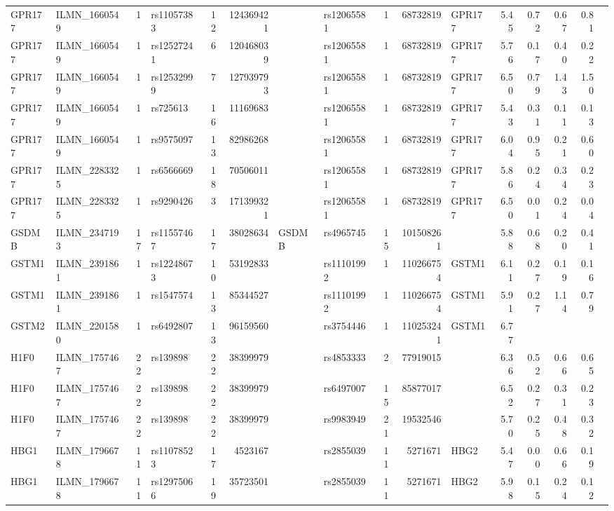 \documentclass{article}
\begin{document}
\begin{landscape}
{\begin{ThreePartTable}
\begin{longtable}{|llr|lrrl|lrrl|rrrr|r|}
  GPR177 & ILMN\_1660549 & 1 & rs11057383 & 12 & 124369421 &  & rs12065581 & 1 & 68732819 & GPR177 & 5.45 & 0.72 & 0.67 & 0.81 &  \\
  GPR177 & ILMN\_1660549 & 1 & rs12527241 & 6 & 120468039 &  & rs12065581 & 1 & 68732819 & GPR177 & 5.76 & 0.17 & 0.40 & 0.22 &  \\
  GPR177 & ILMN\_1660549 & 1 & rs12532999 & 7 & 127939793 &  & rs12065581 & 1 & 68732819 & GPR177 & 6.50 & 0.79 & 1.43 & 1.50 &  \\
  GPR177 & ILMN\_1660549 & 1 & rs725613 & 16 & 11169683 &  & rs12065581 & 1 & 68732819 & GPR177 & 5.43 & 0.31 & 0.11 & 0.13 &  \\
  GPR177 & ILMN\_1660549 & 1 & rs9575097 & 13 & 82986268 &  & rs12065581 & 1 & 68732819 & GPR177 & 6.04 & 0.95 & 0.21 & 0.60 &  \\
  GPR177 & ILMN\_2283325 & 1 & rs6566669 & 18 & 70506011 &  & rs12065581 & 1 & 68732819 & GPR177 & 5.86 & 0.24 & 0.34 & 0.23 &  \\
  GPR177 & ILMN\_2283325 & 1 & rs9290426 & 3 & 171399321 &  & rs12065581 & 1 & 68732819 & GPR177 & 6.50 & 0.01 & 0.24 & 0.04 &  \\
  GSDMB & ILMN\_2347193 & 17 & rs11557467 & 17 & 38028634 & GSDMB & rs4965745 & 15 & 101508261 &  & 5.88 & 0.68 & 0.20 & 0.41 &  \\
  GSTM1 & ILMN\_2391861 & 1 & rs12248673 & 10 & 53192833 &  & rs11101992 & 1 & 110266754 & GSTM1 & 6.11 & 0.27 & 0.19 & 0.16 &  \\
  GSTM1 & ILMN\_2391861 & 1 & rs1547574 & 13 & 85344527 &  & rs11101992 & 1 & 110266754 & GSTM1 & 5.91 & 0.27 & 1.14 & 0.79 &  \\
  GSTM2 & ILMN\_2201580 & 1 & rs6492807 & 13 & 96159560 &  & rs3754446 & 1 & 110253241 & GSTM1 & 6.77 &  &  &  &  \\
  H1F0 & ILMN\_1757467 & 22 & rs139898 & 22 & 38399979 &  & rs4853333 & 2 & 77919015 &  & 6.36 & 0.52 & 0.66 & 0.65 &  \\
  H1F0 & ILMN\_1757467 & 22 & rs139898 & 22 & 38399979 &  & rs6497007 & 15 & 85877017 &  & 6.52 & 0.27 & 0.31 & 0.23 &  \\
  H1F0 & ILMN\_1757467 & 22 & rs139898 & 22 & 38399979 &  & rs9983949 & 21 & 19532546 &  & 5.70 & 0.25 & 0.48 & 0.32 &  \\
  HBG1 & ILMN\_1796678 & 11 & rs11078523 & 17 & 4523167 &  & rs2855039 & 11 & 5271671 & HBG2 & 5.47 & 0.00 & 0.66 & 0.19 &  \\
  HBG1 & ILMN\_1796678 & 11 & rs12975066 & 19 & 35723501 &  & rs2855039 & 11 & 5271671 & HBG2 & 5.98 & 0.15 & 0.24 & 0.12 &  \\

\end{longtable}
\end{ThreePartTable}}
\end{landscape}
\end{document}
